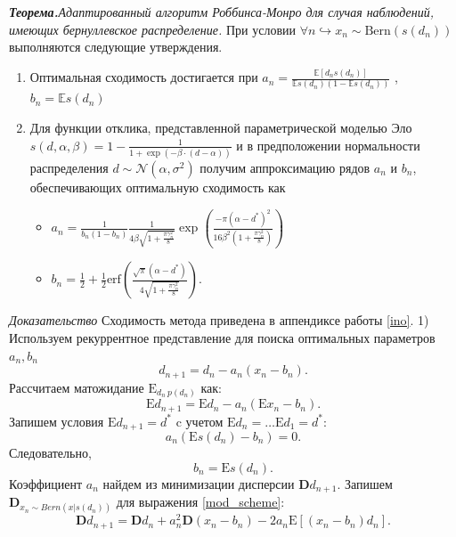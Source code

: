 \documentclass{mipt-thesis-bs}
\begin{document}
\textit{\textbf{Теорема.}Адаптированный алгоритм Роббинса-Монро для случая наблюдений, имеющих бернуллевское распределение.} \label{algo} 
При условии $\forall n \hookrightarrow x_n \sim \text{Bern}(s(d_n))$ выполняются следующие утверждения. \begin{enumerate}
    \item Оптимальная сходимость достигается при $a_n = \frac{\mathbb{E}[d_n s(d_n)]}{\mathbb{E}s(d_n)(1 - \mathbb{E}s(d_n))}$ , $b_n =\mathbb{E} s(d_n)$
    \item Для функции отклика, представленной параметрической моделью Эло $s(d,\alpha,\beta) = 1 - \frac{1}{1+\exp\left(-\beta \cdot(d -\alpha)\right)}$
     и в предположении нормальности распределения $d \sim \mathcal{N}(\alpha,\sigma^2)$ получим аппроксимацию рядов $a_n$ и $b_n$, обеспечивающих оптимальную сходимость как\begin{itemize}
        \item $a_n = \frac{1}{b_n(1-b_n)} \frac{1}{4  \beta \sqrt{1+\frac{\pi\gamma_n^2}{8}}} \exp\left( \frac{- \pi (\alpha-d^*)^2}{16  \beta^2 ( 1+\frac{\pi\gamma_n^2}{8})}\right)$
        \item $b_n = \frac{1}{2} + \frac{1}{2} \text{erf}\left(\frac{\sqrt{\pi} (\alpha-d^*)}{4 \sqrt{1+\frac{\pi\gamma_n^2}{8}}} \right)$.
    \end{itemize} 
\end{enumerate}
\textit{Доказательство}
Сходимость метода приведена в аппендиксе работы \ref{ino}.
1) Используем рекуррентное представление для поиска оптимальных параметров $a_n,b_n$
\begin{equation}
    d_{n+1} = d_n -  a_n(x_n-b_n).
    \label{mod_scheme}
\end{equation}
Рассчитаем матожидание $\mathrm{E}_{d_n ~ p(d_n)}$ как:
\begin{equation}
    \mathrm{E} d_{n+1} = \mathrm{E} d_n -  a_n(\mathrm{E}x_n-b_n).
\end{equation}
Запишем условия $\mathrm{E} d_{n+1} = d^*$ c учетом $\mathrm{E} d_{n} = \dots \mathrm{E} d_{1}= d^*$:
\begin{equation}
    a_n (\mathrm{E} s(d_n) - b_n)  =0.
\end{equation}
Следовательно,
\begin{equation}
    \label{b_n}
    b_n = \mathrm{E} s(d_n).
\end{equation}
Коэффициент $a_n$ найдем из минимизации дисперсии $\mathbf{D} d_{n+1}$. Запишем $\mathbf{D}_{x_n \sim Bern(x | s(d_n))}$ для выражения \ref{mod_scheme}:
\begin{equation}
    \label{disp}
    \mathbf{D} d_{n+1} = \mathbf{D} d_n + a_n^2 \mathbf{D} (x_n-b_n)  - 2 a_n \mathrm{E}\left[(x_n-b_n)d_n\right].
\end{equation}
\end{document}
